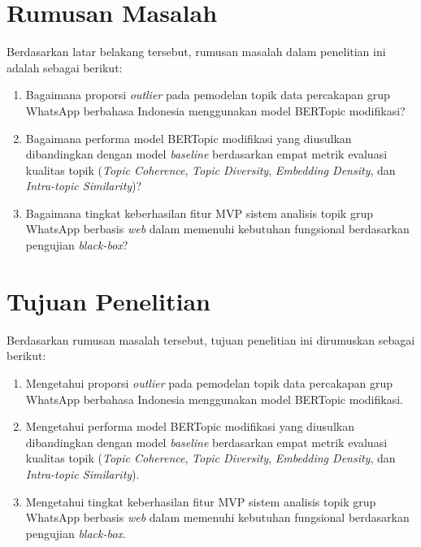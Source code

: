 \section{Rumusan Masalah}
\label{sec:intro-problem}

\noindent Berdasarkan latar belakang tersebut, rumusan masalah dalam penelitian ini adalah sebagai berikut:
\begin{enumerate}[nosep]
    \item Bagaimana proporsi \textit{outlier} pada pemodelan topik data percakapan grup WhatsApp berbahasa Indonesia menggunakan model BERTopic modifikasi?
    \item Bagaimana performa model BERTopic modifikasi yang diusulkan dibandingkan dengan model \textit{baseline} berdasarkan empat metrik evaluasi kualitas topik (\textit{Topic Coherence}, \textit{Topic Diversity}, \textit{Embedding Density}, dan \textit{Intra-topic Similarity})?
    \item Bagaimana tingkat keberhasilan fitur MVP sistem analisis topik grup WhatsApp berbasis \textit{web} dalam memenuhi kebutuhan fungsional berdasarkan pengujian \textit{black-box}?
\end{enumerate}

\section{Tujuan Penelitian}
\label{sec:intro-objectives}

\noindent Berdasarkan rumusan masalah tersebut, tujuan penelitian ini dirumuskan sebagai berikut:
\begin{enumerate}[nosep]
    \item Mengetahui proporsi \textit{outlier} pada pemodelan topik data percakapan grup WhatsApp berbahasa Indonesia menggunakan model BERTopic modifikasi.
    \item Mengetahui performa model BERTopic modifikasi yang diusulkan dibandingkan dengan model \textit{baseline} berdasarkan empat metrik evaluasi kualitas topik (\textit{Topic Coherence}, \textit{Topic Diversity}, \textit{Embedding Density}, dan \textit{Intra-topic Similarity}).
    \item Mengetahui tingkat keberhasilan fitur MVP sistem analisis topik grup WhatsApp berbasis \textit{web} dalam memenuhi kebutuhan fungsional berdasarkan pengujian \textit{black-box}.
\end{enumerate}

